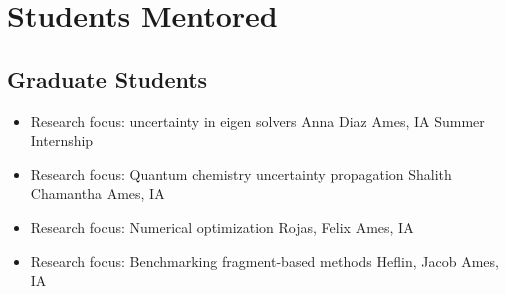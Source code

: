 \section{Students Mentored}
	\subsection{Graduate Students}
	\begin{itemize}
		\item{
			{Research focus: uncertainty in eigen solvers}
			{Anna Diaz}
			{Ames, IA}
			{Summer Internship}{}
		}
		\item {
			{Research focus: Quantum chemistry uncertainty propagation}
			{Shalith Chamantha}
			{Ames, IA}
			{}{}
		}
		\item{
			{Research focus: Numerical optimization}
			{Rojas, Felix}
			{Ames, IA}
			{}{}
		}
		\item{
			{Research focus: Benchmarking fragment-based methods}
			{Heflin, Jacob}
			{Ames, IA}
			{}{}
		}
	\end{itemize}
	
